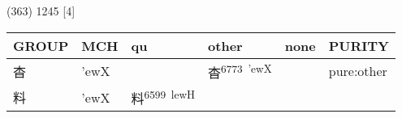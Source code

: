 \documentclass[14pt,a4paper]{scrartcl}
\begin{document}
(363) 1245 {[}4{]}

\begin{longtable}[c]{@{}llllll@{}}
\toprule
\begin{minipage}[b]{0.14\columnwidth}\raggedright\strut
GROUP
\strut\end{minipage} &
\begin{minipage}[b]{0.14\columnwidth}\raggedright\strut
MCH
\strut\end{minipage} &
\begin{minipage}[b]{0.14\columnwidth}\raggedright\strut
qu
\strut\end{minipage} &
\begin{minipage}[b]{0.14\columnwidth}\raggedright\strut
other
\strut\end{minipage} &
\begin{minipage}[b]{0.14\columnwidth}\raggedright\strut
none
\strut\end{minipage} &
\begin{minipage}[b]{0.14\columnwidth}\raggedright\strut
PURITY
\strut\end{minipage}\tabularnewline
\midrule
\endhead
\begin{minipage}[t]{0.14\columnwidth}\raggedright\strut
杳
\strut\end{minipage} &
\begin{minipage}[t]{0.14\columnwidth}\raggedright\strut
'ewX
\strut\end{minipage} &
\begin{minipage}[t]{0.14\columnwidth}\raggedright\strut
\strut\end{minipage} &
\begin{minipage}[t]{0.14\columnwidth}\raggedright\strut
杳\textsuperscript{6773~'ewX}
\strut\end{minipage} &
\begin{minipage}[t]{0.14\columnwidth}\raggedright\strut
\strut\end{minipage} &
\begin{minipage}[t]{0.14\columnwidth}\raggedright\strut
pure:other
\strut\end{minipage}\tabularnewline
\begin{minipage}[t]{0.14\columnwidth}\raggedright\strut
料
\strut\end{minipage} &
\begin{minipage}[t]{0.14\columnwidth}\raggedright\strut
'ewX
\strut\end{minipage} &
\begin{minipage}[t]{0.14\columnwidth}\raggedright\strut
料\textsuperscript{6599~lewH}

\end{minipage}
\end{longtable}
\end{document}
